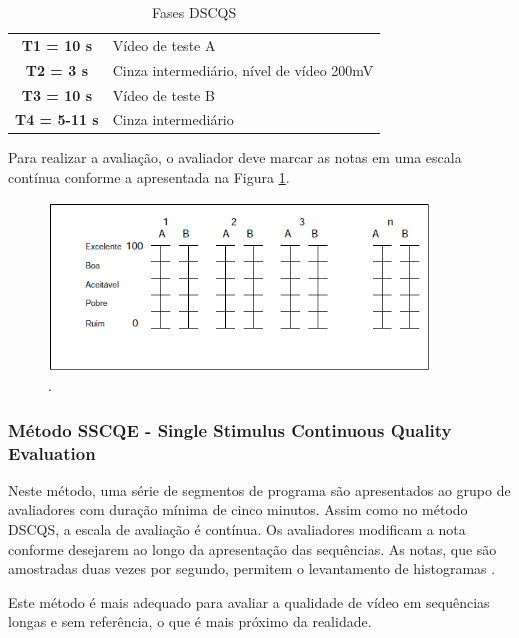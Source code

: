 \begin{table}
	\centering
	\caption{Fases DSCQS}
	\label{tab:dsisfases}
	\begin{tabular}{c|l}
		\hline
		\textbf{T1 = 10 s} & Vídeo de teste A \\
		\textbf{T2 = 3 s} & Cinza intermediário, nível de vídeo 200mV \\
		\textbf{T3 = 10 s} & Vídeo de teste B \\
		\textbf{T4 = 5-11 s} & Cinza intermediário \\
		\hline
	\end{tabular}
\end{table}

Para realizar a avaliação, o avaliador deve marcar as notas em uma escala contínua conforme a apresentada na Figura \ref{fig:dscqsescala}.

\begin{figure}[!htb]
	\centering
	\includegraphics[width=0.9\textwidth]{./imgs/dscqsescala.png}
	\caption{.}
	\label{fig:dscqsescala}
\end{figure}

\subsubsection[Método SSCQE]{Método SSCQE - Single Stimulus Continuous Quality Evaluation}

Neste método, uma série de segmentos de programa são apresentados ao grupo de avaliadores com duração mínima de cinco minutos. Assim como no método DSCQS, a escala de avaliação é contínua. Os avaliadores modificam a nota conforme desejarem ao longo da apresentação das sequências. As notas, que são amostradas duas vezes por segundo, permitem o levantamento de histogramas \cite{rehme}.

Este método é mais adequado para avaliar a qualidade de vídeo em sequências longas e sem referência, o que é mais próximo da realidade.

